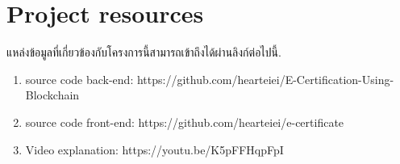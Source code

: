\chapter{Project resources}

แหล่งข้อมูลที่เกี่ยวข้องกับโครงการนี้สามารถเข้าถึงได้ผ่านลิงก์ต่อไปนี้.

\begin{enumerate}
    \item source code back-end: https://github.com/hearteiei/E-Certification-Using-Blockchain
    \item source code front-end: https://github.com/hearteiei/e-certificate
    \item Video explanation: https://youtu.be/K5pFFHqpFpI
\end{enumerate}











